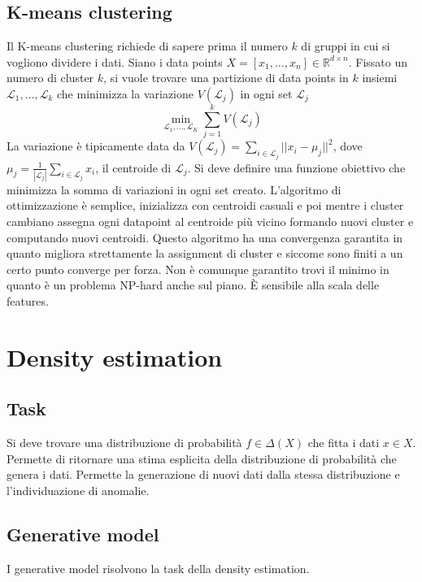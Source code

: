 	\subsection{K-means clustering}
	Il K-means clustering richiede di sapere prima il numero $k$ di gruppi in cui si vogliono dividere i dati.
	Siano i data points $X=[x_1,\dots,x_n]\in\mathbb{R}^{d\times n}$.
	Fissato un numero di cluster $k$, si vuole trovare una partizione di data points in $k$ insiemi $\mathcal{L}_1,\dots,\mathcal{L}_k$ che minimizza la variazione $V(\mathcal{L}_j)$ in ogni set $\mathcal{L}_j$
	$$\min\limits_{\mathcal{L}_1,\dots,\mathcal{L}_K}\sum\limits_{j = 1}^kV(\mathcal{L}_j)$$
	La variazione \`e tipicamente data da $V(\mathcal{L}_j) = \sum\limits_{i\in\mathcal{L}_j}||x_i-\mu_j||^2$, dove $\mu_j = \frac{1}{|\mathcal{L}_j|}\sum\limits_{i\in\mathcal{L}_j}x_i$, il centroide di $\mathcal{L}_j$.
	Si deve definire una funzione obiettivo che minimizza la somma di variazioni in ogni set creato.
	L'algoritmo di ottimizzazione \`e semplice, inizializza con centroidi casuali e poi mentre i cluster cambiano assegna ogni datapoint al centroide pi\`u vicino formando nuovi cluster e computando nuovi centroidi.
	Questo algoritmo ha una convergenza garantita in quanto migliora strettamente la assignment di cluster e siccome sono finiti a un certo punto converge per forza.
	Non \`e comunque garantito trovi il minimo in quanto \`e un problema NP-hard anche sul piano.
	\`E sensibile alla scala delle features.
\section{Density estimation}

	\subsection{Task}
	Si deve trovare una distribuzione di probabilit\`a $f\in \Delta(X)$ che fitta i dati $x\in X$.
	Permette di ritornare una stima esplicita della distribuzione di probabilit\`a che genera i dati.
	Permette la generazione di nuovi dati dalla stessa distribuzione e l'individuazione di anomalie.

	\subsection{Generative model}
	I generative model risolvono la task della density estimation.

